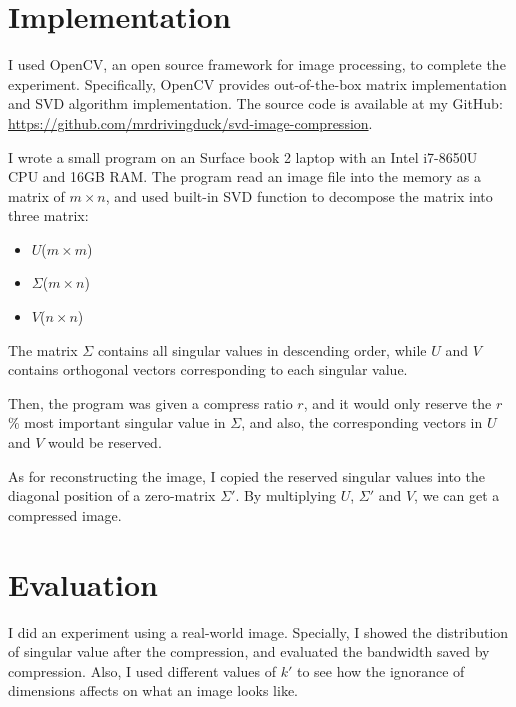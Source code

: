\documentclass{article}
\begin{document}
    \section{Implementation}
        \par
        I used OpenCV, an open source framework for image processing, to complete the experiment.
        Specifically, OpenCV provides out-of-the-box matrix implementation
        and SVD algorithm implementation. The source code is available at my GitHub:
            \url{https://github.com/mrdrivingduck/svd-image-compression}.
        \par
        I wrote a small program on an Surface book 2 laptop with an Intel i7-8650U CPU and 16GB RAM.
        The program read an image file into the memory as a matrix of $m \times n$,
        and used built-in SVD function to decompose the matrix into three matrix:
        \begin{itemize}
            \item $U$($m \times m$)
            \item $\Sigma$($m \times n$)
            \item $V$($n \times n$)
        \end{itemize}
        The matrix $\Sigma$ contains all singular values in descending order,
        while $U$ and $V$ contains orthogonal vectors corresponding to each singular value.
        \par
        Then, the program was given a compress ratio $r$,
        and it would only reserve the $r$\% most important singular value in $\Sigma$,
        and also, the corresponding vectors in $U$ and $V$ would be reserved.
        \par
        As for reconstructing the image,
        I copied the reserved singular values into the diagonal position of a zero-matrix $\Sigma'$.
        By multiplying $U$, $\Sigma'$ and $V$, we can get a compressed image.

    \section{Evaluation}
        \par
        I did an experiment using a real-world image.
        Specially, I showed the distribution of singular value after the compression,
        and evaluated the bandwidth saved by compression.
        Also, I used different values of $k'$ to see
        how the ignorance of dimensions affects on what an image looks like.
\end{document}
